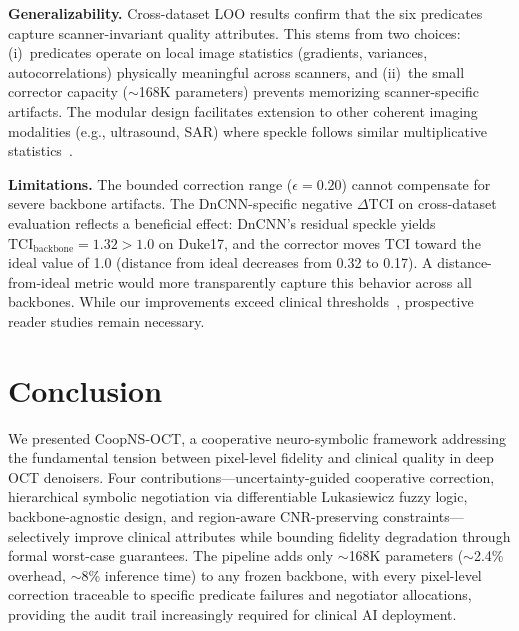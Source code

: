 \documentclass[journal,twoside,web]{ieeecolor}
\begin{document}
\textbf{Generalizability.}
Cross-dataset LOO results confirm that the six predicates capture scanner-invariant quality attributes. This stems from two choices: (i)~predicates operate on local image statistics (gradients, variances, autocorrelations) physically meaningful across scanners, and (ii)~the small corrector capacity (${\sim}$168K parameters) prevents memorizing scanner-specific artifacts. The modular design facilitates extension to other coherent imaging modalities (e.g., ultrasound, SAR) where speckle follows similar multiplicative statistics~\cite{goodman2007speckle}.

\textbf{Limitations.}
The bounded correction range ($\epsilon = 0.20$) cannot compensate for severe backbone artifacts. The DnCNN-specific negative $\Delta$TCI on cross-dataset evaluation reflects a beneficial effect: DnCNN's residual speckle yields $\text{TCI}_{\text{backbone}} = 1.32 > 1.0$ on Duke17, and the corrector moves TCI toward the ideal value of 1.0 (distance from ideal decreases from 0.32 to 0.17). A distance-from-ideal metric would more transparently capture this behavior across all backbones. While our improvements exceed clinical thresholds~\cite{stein2006quality}, prospective reader studies remain necessary.

\section{Conclusion}
\label{sec:conclusion}

We presented CoopNS-OCT, a cooperative neuro-symbolic framework addressing the fundamental tension between pixel-level fidelity and clinical quality in deep OCT denoisers. Four contributions---uncertainty-guided cooperative correction, hierarchical symbolic negotiation via differentiable Lukasiewicz fuzzy logic, backbone-agnostic design, and region-aware CNR-preserving constraints---selectively improve clinical attributes while bounding fidelity degradation through formal worst-case guarantees. The pipeline adds only ${\sim}$168K parameters (${\sim}$2.4\% overhead, ${\sim}$8\% inference time) to any frozen backbone, with every pixel-level correction traceable to specific predicate failures and negotiator allocations, providing the audit trail increasingly required for clinical AI deployment.
\end{document}
